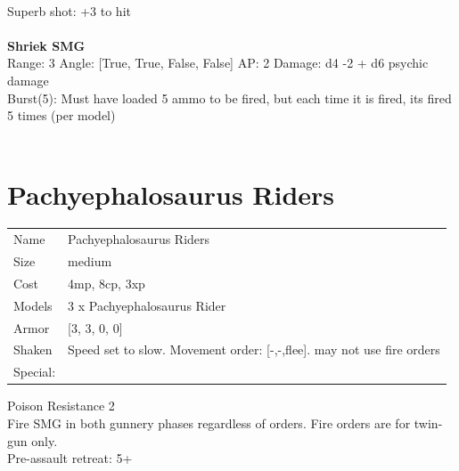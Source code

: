 \ \\
Superb shot: +3 to hit\\ 

\ \\
{\bf Shriek SMG } \\



Range: 3  Angle: [True, True, False, False] AP: 2 Damage: d4 -2 + d6 psychic damage \\
Burst(5): Must have loaded 5 ammo to be fired, but each time it is fired, its fired 5 times (per model)\\ 




 
\ \\













\clearpage

\section{ Pachyephalosaurus Riders }

\begin{tabular}{ll}
  Name & Pachyephalosaurus Riders \\
  Size & medium\\
  Cost & 4mp, 8cp, 3xp\\
  Models & 3 x Pachyephalosaurus Rider\\
  Armor & [3, 3, 0, 0]\\
  Shaken & Speed set to slow. Movement order: [-,-,flee]. may not use fire orders\\
  Special: \\
\end{tabular}

\noindent Poison Resistance 2\\ 
Fire SMG in both gunnery phases regardless of orders. Fire orders are for twin-gun only.\\ 
Pre-assault retreat: 5+\\ 



